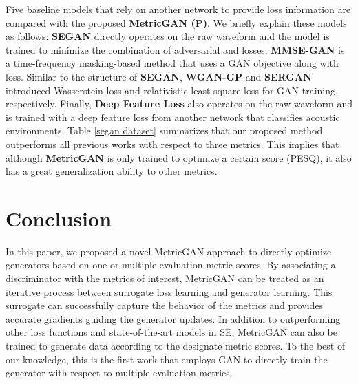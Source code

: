 \documentclass{article}
\begin{document}
Five baseline models that rely on another network to provide loss information are compared with the proposed \textbf{MetricGAN (P)}. We briefly explain these models as follows: \textbf{SEGAN} \cite{pascual2017segan} directly operates on the raw waveform and the model is trained to minimize the combination of adversarial and  losses. \textbf{MMSE-GAN} \cite{ soni2018time} is a time-frequency masking-based method that uses a GAN objective along with  loss. Similar to the structure of \textbf{SEGAN}, \textbf{WGAN-GP} and \textbf{SERGAN} \cite{baby2019sergan} introduced Wasserstein loss and relativistic least-square loss for GAN training, respectively.
Finally, \textbf{Deep Feature Loss}  \cite{germain2018speech} also operates on the raw waveform and is trained with a deep feature loss from another network that classifies acoustic environments. Table \ref{segan dataset} summarizes that our proposed method outperforms all previous works with respect to three metrics. This implies that although \textbf{MetricGAN} is only trained to optimize a certain score (PESQ), it also has a great generalization ability to other metrics.



\section{Conclusion}
In this paper, we proposed a novel MetricGAN approach to directly optimize generators based on one or multiple evaluation metric scores. By associating a discriminator with the metrics of interest, MetricGAN can be treated as an iterative process between surrogate loss learning and generator learning. This surrogate can successfully capture the behavior of the metrics and provides accurate gradients guiding the generator updates. In addition to outperforming other loss functions and state-of-the-art models in SE, MetricGAN can also be trained to generate data according to the designate metric scores. To the best of our knowledge, this is the first work that employs GAN to directly train the generator with respect to multiple evaluation metrics.










\nocite{langley00}



\end{document}
